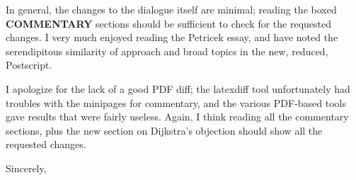 \documentclass{letter}
\begin{document}
\begin{letter}{}
\begin{enumerate}
\end{enumerate}

In general, the changes to the dialogue itself are minimal; reading the boxed {\bf COMMENTARY} sections should be sufficient to check for the requested changes.  I very much enjoyed reading the Petricek essay, and have noted the serendipitous similarity of approach and broad topics in the new, reduced, Postscript.

I apologize for the lack of a good PDF diff; the latexdiff tool unfortunately had troubles with the minipages for commentary, and the various PDF-based tools gave results that were fairly useless.  Again, I think reading all the commentary sections, plus the new section on Dijkstra's objection should show all the requested changes.

\closing{Sincerely,}



\end{letter}
\end{document}
